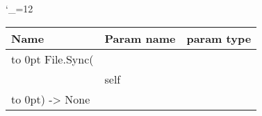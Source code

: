 \begingroup \catcode`\_=12 \tt
\begin{tabular}{lll}
\toprule
\textrm{Name}&\textrm{Param name}&\textrm{param type}\\
\midrule
\hbox to 0pt {File.Sync(\hss}\\
& self\\
\hbox to 0pt{) -> None\hss}\\
\bottomrule
\end{tabular}
\endgroup
